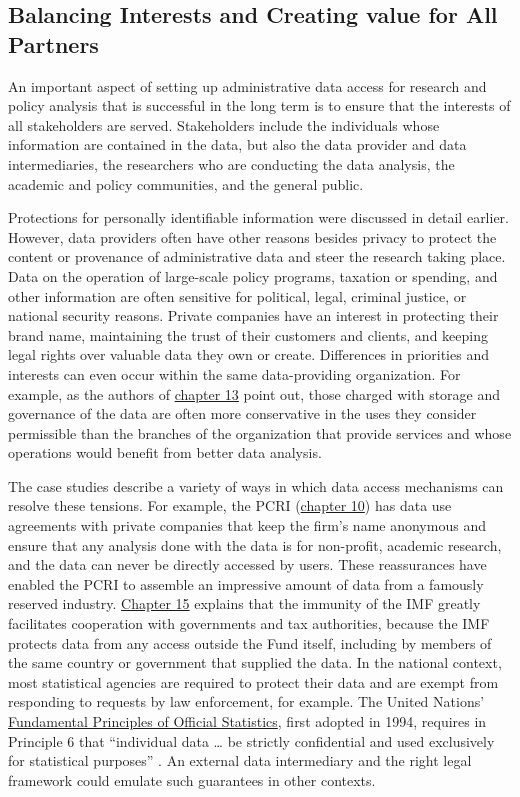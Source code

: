 \hypertarget{balancing-interests-and-creating-value-for-all-partners}{%
\subsection{Balancing Interests and Creating value for All Partners}\label{balancing-interests-and-creating-value-for-all-partners}}

An important aspect of setting up administrative data access for research and policy analysis that is successful in the long term is to ensure that the interests of all stakeholders are served. Stakeholders include the individuals whose information are contained in the data, but also the data provider and data intermediaries, the researchers who are conducting the data analysis, the academic and policy communities, and the general public.

Protections for personally identifiable information were discussed in detail earlier. However, data providers often have other reasons besides privacy to protect the content or provenance of administrative data and steer the research taking place. Data on the operation of large-scale policy programs, taxation or spending, and other information are often sensitive for political, legal, criminal justice, or national security reasons. Private companies have an interest in protecting their brand name, maintaining the trust of their customers and clients, and keeping legal rights over valuable data they own or create. Differences in priorities and interests can even occur within the same data-providing organization. For example, as the authors of \protect\hyperlink{cct}{chapter 13} point out, those charged with storage and governance of the data are often more conservative in the uses they consider permissible than the branches of the organization that provide services and whose operations would benefit from better data analysis.

The case studies describe a variety of ways in which data access mechanisms can resolve these tensions. For example, the PCRI (\protect\hyperlink{pcri}{chapter 10}) has data use agreements with private companies that keep the firm's name anonymous and ensure that any analysis done with the data is for non-profit, academic research, and the data can never be directly accessed by users. These reassurances have enabled the PCRI to assemble an impressive amount of data from a famously reserved industry. \protect\hyperlink{imf}{Chapter 15} explains that the immunity of the IMF greatly facilitates cooperation with governments and tax authorities, because the IMF protects data from any access outside the Fund itself, including by members of the same country or government that supplied the data. In the national context, most statistical agencies are required to protect their data and are exempt from responding to requests by law enforcement, for example. The United Nations' \href{https://unstats.un.org/unsd/dnss/gp/fundprinciples.aspx}{Fundamental Principles of Official Statistics}, first adopted in 1994, requires in Principle 6 that ``individual data \ldots{} be strictly confidential and used exclusively for statistical purposes'' \citep{unitednations2014}. An external data intermediary and the right legal framework could emulate such guarantees in other contexts.

